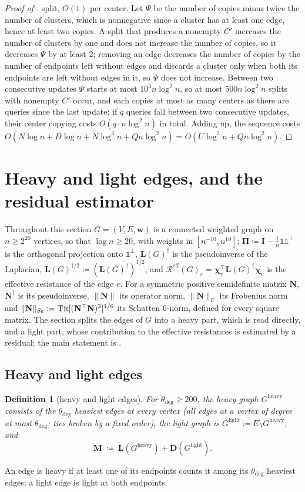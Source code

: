 \documentclass[11pt]{article}
\newtheorem{definition}[theorem]{Definition}
\theoremstyle{remark}
\newcommand{\cchi}{{\boldsymbol\chi}}
\newcommand{\DD}{\mathbf D}
\newcommand{\II}{\mathbf I}
\newcommand{\LL}{\mathbf L}
\newcommand{\MM}{\mathbf M}
\newcommand{\NN}{\mathbf N}
\newcommand{\PPi}{{\boldsymbol\Pi}}
\newcommand{\ww}{\mathbf w}
\newcommand{\dheavy}{\theta_{\deg}}
\newcommand{\Gh}{G^{\mathrm{heavy}}}
\newcommand{\Gl}{G^{\mathrm{light}}}
\newcommand{\Rcal}{\mathcal{R}}
\newcommand{\Reff}{\Rcal^{\mathrm{eff}}}
\newcommand{\defeq}{\coloneqq}
\newcommand{\norm}[1]{\lVert#1\rVert}
\newcommand{\oone}{\mathds{1}}
\newcommand{\tr}{\textsc{Tr}}
\begin{document}
\begin{proof}[Proof of ]
split, $O(1)$ per center.
Let $\Psi$ be the number of copies minus twice the number of clusters, which
is nonnegative since a cluster has at least one edge, hence at least two
copies.
A split that produces a nonempty $C'$ increases the number of clusters by
one and does not increase the number of copies, so it decreases $\Psi$ by
at least $2$; removing an edge decreases the number of copies by the number
of endpoints left without edges and discards a cluster only when both its
endpoints are left without edges in it, so $\Psi$ does not increase.
Between two consecutive updates $\Psi$ starts at most
$10^{3} n \log^{2} n$, so at most $500 n \log^{2} n$ splits with nonempty
$C'$ occur, and each copies at most as many centers as there are queries
since the last update; if $q$ queries fall between two consecutive updates,
their center copying costs $O(q \cdot n \log^{2} n)$ in total.
Adding up, the sequence costs
$O(N \log n + D \log n + N \log^{3} n + Q n \log^{2} n)
= O(U \log^{3} n + Q n \log^{2} n)$.
\end{proof}

\section{Heavy and light edges, and the residual estimator}
\label{sec:resistance}

Throughout this section $G=(V,E,\ww)$ is a connected weighted graph on
$n\ge2^{20}$ vertices, so that $\log n\ge20$, with weights in
$[n^{-10},n^{10}]$; $\PPi\defeq\II-\frac1n\oone\oone^{\top}$ is the
orthogonal projection onto $\oone^{\perp}$, $\LL(G)^{\dag}$ is the
pseudoinverse of the Laplacian, $\LL(G)^{\dag/2}\defeq(\LL(G)^{\dag})^{1/2}$,
and $\Reff(G)_e=\cchi_e^{\top}\LL(G)^{\dag}\cchi_e$ is the effective
resistance of the edge $e$.
For a symmetric positive semidefinite matrix $\NN$, $\NN^{\dag}$ is its
pseudoinverse, $\norm{\NN}$ its operator norm, $\norm{\NN}_F$ its Frobenius
norm and $\norm{\NN}_{S_6}\defeq\tr[(\NN^{\top}\NN)^{3}]^{1/6}$ its
Schatten $6$-norm, defined for every square matrix.
The section splits the edges of $G$ into a heavy part, which is read
directly, and a light part, whose contribution to the effective
resistances is estimated by a residual; the main statement is
.

\subsection{Heavy and light edges}

\begin{definition}[heavy and light edges]
\label{def:heavy}
For $\dheavy\ge200$, the \emph{heavy graph} $\Gh$ consists of the
$\dheavy$ heaviest edges at every vertex (all edges at a vertex of degree at
most $\dheavy$; ties broken by a fixed order), the \emph{light graph} is
$\Gl\defeq E\setminus\Gh$, and
\[
\MM\ \defeq\ \LL(\Gh)+\DD(\Gl).
\]
\end{definition}
An edge is heavy if at least one of its endpoints counts it among its
$\dheavy$ heaviest edges; a light edge is light at both endpoints.
\end{document}

